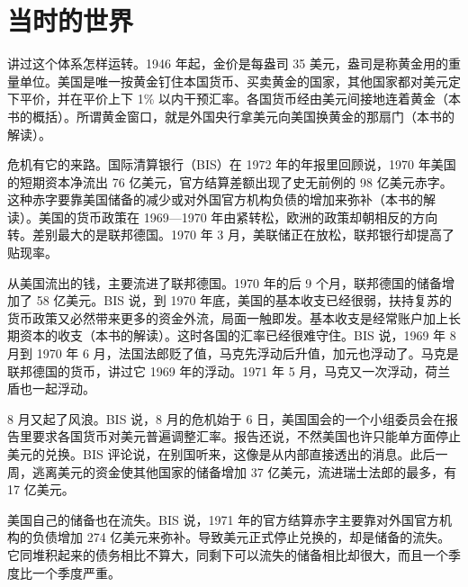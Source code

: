 \section{当时的世界}\label{sec:floating-world}

讲过这个体系怎样运转。1946 年起，金价是每盎司 35 美元，盎司是称黄金用的重量单位。美国是唯一按黄金钉住本国货币、买卖黄金的国家，其他国家都对美元定下平价，并在平价上下 1\% 以内干预汇率。各国货币经由美元间接地连着黄金（本书的概括）。所谓黄金窗口，就是外国央行拿美元向美国换黄金的那扇门（本书的解读）。

危机有它的来路。国际清算银行（BIS）在 1972 年的年报里回顾说，1970 年美国的短期资本净流出 76 亿美元，官方结算差额出现了史无前例的 98 亿美元赤字\cite{bis1972}。这种赤字要靠美国储备的减少或对外国官方机构负债的增加来弥补（本书的解读）。美国的货币政策在 1969—1970 年由紧转松，欧洲的政策却朝相反的方向转\cite{bis1972}。差别最大的是联邦德国。1970 年 3 月，美联储正在放松，联邦银行却提高了贴现率\cite{bis1972}。

从美国流出的钱，主要流进了联邦德国。1970 年的后 9 个月，联邦德国的储备增加了 58 亿美元\cite{bis1972}。BIS 说，到 1970 年底，美国的基本收支已经很弱，扶持复苏的货币政策又必然带来更多的资金外流，局面一触即发\cite{bis1972}。基本收支是经常账户加上长期资本的收支（本书的解读）。这时各国的汇率已经很难守住。BIS 说，1969 年 8 月到 1970 年 6 月，法国法郎贬了值，马克先浮动后升值，加元也浮动了\cite{bis1972}。马克是联邦德国的货币，讲过它 1969 年的浮动。1971 年 5 月，马克又一次浮动，荷兰盾也一起浮动\cite{bis1972,bis1973}。

8 月又起了风浪。BIS 说，8 月的危机始于 6 日，美国国会的一个小组委员会在报告里要求各国货币对美元普遍调整汇率\cite{bis1972}。报告还说，不然美国也许只能单方面停止美元的兑换\cite{bis1972}。BIS 评论说，在别国听来，这像是从内部直接透出的消息\cite{bis1972}。此后一周，逃离美元的资金使其他国家的储备增加 37 亿美元，流进瑞士法郎的最多，有 17 亿美元\cite{bis1972}。

美国自己的储备也在流失。BIS 说，1971 年的官方结算赤字主要靠对外国官方机构的负债增加 274 亿美元来弥补\cite{bis1972}。导致美元正式停止兑换的，却是储备的流失\cite{bis1972}。它同堆积起来的债务相比不算大，同剩下可以流失的储备相比却很大，而且一个季度比一个季度严重\cite{bis1972}。

